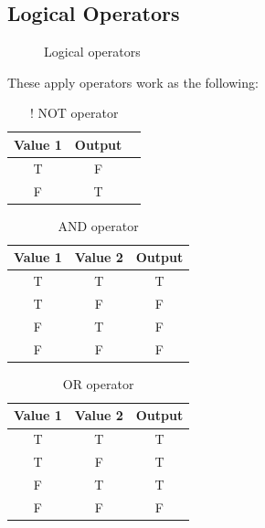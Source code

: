 \documentclass[11pt,a4 paper]{book}
\theoremstyle{plain}
\theoremstyle{definition}
\theoremstyle{remark}
\begin{document}
\begin{flushleft}
\subsection{Logical Operators}
\begin{figure}[H]
\centering
{}
\label{fig:input}
\caption{Logical operators}
\end{figure} 
These apply operators work as the following:
\begin{table}[H]
	\centering
	\caption{! NOT operator}
	\label{tab:NOT}
	\begin{tabular}{ccc}
		\hline
		Value 1 & Output \\
		\hline
		T	&	F\\
		F	&	T \\
		\hline
	\end{tabular}
\end{table}
\begin{table}[H]
	\centering
	\caption{AND operator}
	\label{tab:and}
	\begin{tabular}{ccc}
		\hline
		Value 1 & Value 2 & Output \\
		\hline
		T	& T	  & T \\
		T	& F	  & F \\ F	& T	  & F \\ F	& F	  & F \\ \hline \end{tabular} \end{table} \begin{table}[H]
	\centering
	\caption{OR operator}
	\label{tab:OR}
	\begin{tabular}{ccc}
		\hline
	Value 1 & Value 2 & Output \\
	\hline
	T	& T	  & T \\
	T	& F	  & T \\
	F	& T	  & T \\
	F	& F	  & F \\
	\hline
	\end{tabular}
\end{table}
\begin{table}[H]
	\centering

\end{table}
\end{flushleft}
\end{document}
